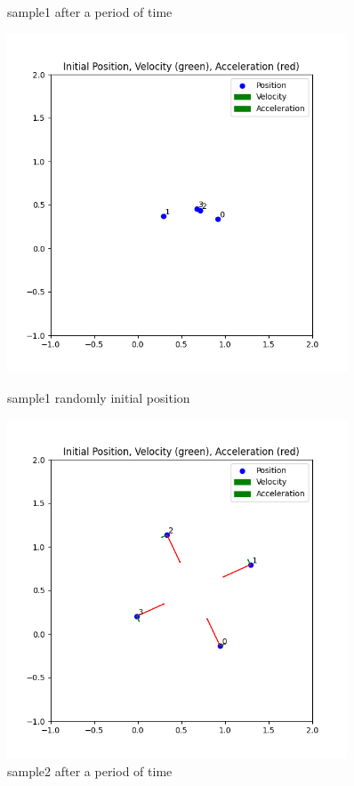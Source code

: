 \documentclass{article}
\theoremstyle{definition} %
\begin{document}
\begin{figure}[ht!]
\begin{minipage}{0.45\textwidth}
        \caption{sample1 after a period of time}
    \end{minipage}
\end{figure}
\begin{figure}[ht!]
    \centering
    \begin{minipage}{0.45\textwidth}
        \centering
        \includegraphics[width=0.9\textwidth]{fig/sample2/dd.png} %
        \caption{sample1 randomly initial position}
        \label{fig:fig2}
    \end{minipage}\hfill
    \begin{minipage}{0.45\textwidth}
        \centering
        \includegraphics[width=0.9\textwidth]{fig/sample2/dd_18993.png} %
        \caption{sample2 after a period of time}
    \end{minipage}
\end{figure}
\end{document}
